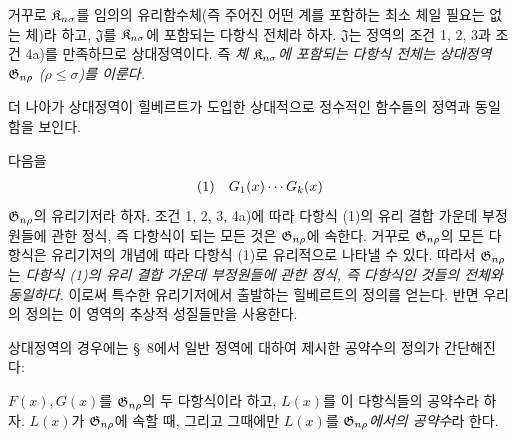 거꾸로 $\mathfrak K_{n\sigma}$를 임의의 유리함수체(즉 주어진 어떤 계를 포함하는 최소 체일 필요는 없는 체)라 하고, $\mathfrak J$를 $\mathfrak K_{n\sigma}$에 포함되는 다항식 전체라 하자. $\mathfrak J$는 정역의 조건 1, 2, 3과 조건 4a)를 만족하므로 상대정역이다. 즉 \emph{체 $\mathfrak K_{n\sigma}$에 포함되는 다항식 전체는 상대정역 $\mathfrak G_{n\rho}$ ($\rho\le\sigma$)를 이룬다.}

더 나아가 상대정역이 힐베르트가 도입한 
\glqq{}상대적으로 정수적인 함수들의 정역\grqq{}과 동일함을 보인다.

다음을
\[
\begin{array}{@{}l@{\quad}c@{}}
(1)& G_1(x)\cdots G_k(x)
\end{array}
\]
$\mathfrak G_{n\rho}$의 유리기저라 하자. 조건 1, 2, 3, 4a)에 따라 다항식 (1)의 유리 결합 가운데 부정원들에 관한 정식, 즉 다항식이 되는 모든 것은 $\mathfrak G_{n\rho}$에 속한다. 거꾸로 $\mathfrak G_{n\rho}$의 모든 다항식은 유리기저의 개념에 따라 다항식 (1)로 유리적으로 나타낼 수 있다. 따라서 $\mathfrak G_{n\rho}$는 \emph{다항식 (1)의 유리 결합 가운데 부정원들에 관한 정식, 즉 다항식인 것들의 전체와 동일하다.} 이로써 특수한 유리기저에서 출발하는 힐베르트의 정의를 얻는다. 반면 우리의 정의는 이 영역의 추상적 성질들만을 사용한다.

상대정역의 경우에는 \S\ 8에서 일반 정역에 대하여 제시한 공약수의 정의가 간단해진다:

$F(x),G(x)$를 $\mathfrak G_{n\rho}$의 두 다항식이라 하고, $L(x)$를 이 다항식들의 공약수라 하자. $L(x)$가 $\mathfrak G_{n\rho}$에 속할 때, 그리고 그때에만 $L(x)$를 \emph{$\mathfrak G_{n\rho}$에서의 공약수}라 한다.

